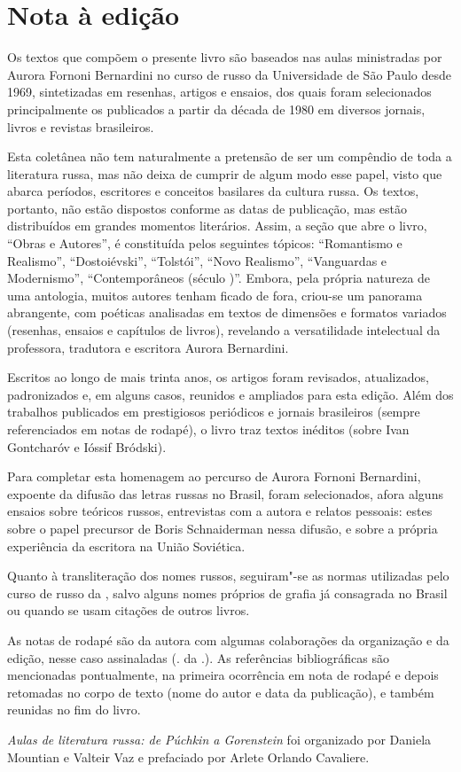 \chapter{Nota à edição}
\label{nota}

Os textos que compõem o presente livro são baseados nas aulas
ministradas por Aurora Fornoni Bernardini no curso de russo da
Universidade de São Paulo desde 1969, sintetizadas em resenhas, artigos
e ensaios, dos quais foram selecionados principalmente os publicados a partir da década
de 1980 em diversos jornais, livros e revistas brasileiros.

Esta coletânea não tem naturalmente a pretensão de ser um compêndio de toda a
literatura russa, mas não deixa de cumprir de algum modo
esse papel, visto que abarca períodos, escritores e conceitos basilares da
cultura russa. Os textos, portanto, não estão dispostos conforme as
datas de publicação, mas estão distribuídos em grandes momentos
literários. Assim, a seção que abre o livro, ``Obras e Autores'', é
constituída pelos seguintes tópicos: ``Romantismo e Realismo'',
``Dostoiévski'', ``Tolstói'', ``Novo Realismo'', ``Vanguardas e
Modernismo'', ``Contemporâneos (século \scalebox{0.8}{XX})''. Embora, pela própria
natureza de uma antologia, muitos autores tenham ficado de fora,
criou-se um panorama abrangente, com poéticas analisadas em textos de
dimensões e formatos variados (resenhas, ensaios e capítulos de livros),
revelando a versatilidade intelectual da professora, tradutora e
escritora Aurora Bernardini.

Escritos ao longo de mais trinta anos, os artigos foram revisados,
atualizados, padronizados e, em alguns casos, reunidos e ampliados para
esta edição. Além dos trabalhos publicados em prestigiosos periódicos e
jornais brasileiros (sempre referenciados em notas de rodapé), o livro
traz textos inéditos (sobre Ivan Gontcharóv e Ióssif Bródski).

Para completar esta homenagem ao percurso de Aurora Fornoni Bernardini,
expoente da difusão das letras russas no Brasil, foram selecionados,
afora alguns ensaios sobre teóricos russos, entrevistas com a autora e
relatos pessoais: estes sobre o papel precursor de Boris Schnaiderman nessa
difusão, e sobre a própria experiência da escritora na União Soviética.

Quanto à transliteração dos nomes russos, seguiram"-se as normas
utilizadas pelo curso de russo da \scalebox{0.8}{USP}, salvo alguns nomes próprios de
grafia já consagrada no Brasil ou quando se usam citações de outros livros.

As notas de rodapé são da autora com algumas colaborações da organização
e da edição, nesse caso assinaladas (\scalebox{0.8}{N}. da \scalebox{0.8}{E}.). As referências
bibliográficas são mencionadas pontualmente, na primeira ocorrência em
nota de rodapé e depois retomadas no corpo de texto (nome do autor e
data da publicação), e também reunidas no fim do livro.

\emph{Aulas de literatura russa: de Púchkin a Gorenstein} foi
organizado por Daniela Mountian e Valteir Vaz e prefaciado por Arlete
Orlando Cavaliere.
